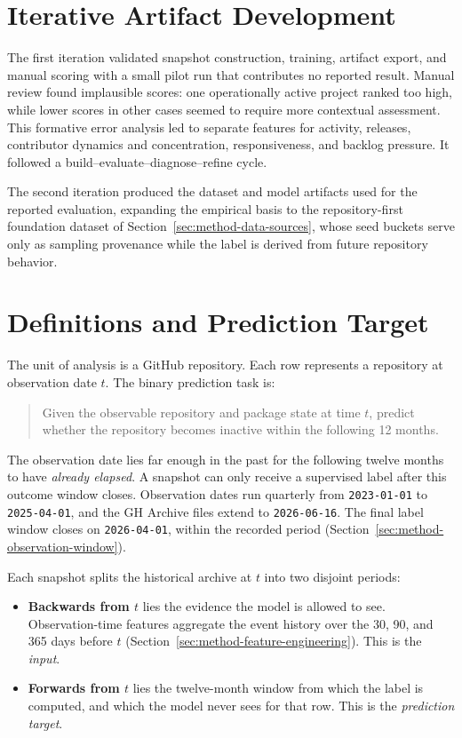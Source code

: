 \section{Iterative Artifact Development}
\label{sec:method-iterative-development}

The first iteration validated snapshot construction, training, artifact export,
and manual scoring with a small pilot run that contributes no reported result.
Manual review found implausible scores: one operationally active project ranked
too high, while lower scores in other cases seemed to require more contextual
assessment. This formative error analysis led to separate features for activity,
releases, contributor dynamics and concentration, responsiveness, and backlog
pressure. It followed a build--evaluate--diagnose--refine cycle.

The second iteration produced the dataset and model artifacts used for the reported evaluation, expanding the empirical basis to the repository-first foundation dataset of Section~\ref{sec:method-data-sources}, whose seed buckets serve only as sampling provenance while the label is derived from future repository behavior.

\section{Definitions and Prediction Target}
\label{sec:method-definitions}

The unit of analysis is a GitHub repository. Each row represents a repository at
observation date \(t\). The binary prediction task is:

\begin{quote}
Given the observable repository and package state at time \(t\), predict whether the repository becomes inactive within the following 12 months.
\end{quote}

The observation date lies far enough in the past for the following twelve months
to have \emph{already elapsed}. A snapshot can only receive a supervised label after this
outcome window closes. Observation dates run quarterly from
\texttt{2023-01-01} to \texttt{2025-04-01}, and the GH Archive files extend to
\texttt{2026-06-16}. The final label window closes on
\texttt{2026-04-01}, within the recorded period
(Section~\ref{sec:method-observation-window}).

Each snapshot splits the historical archive at \(t\) into two disjoint periods:

\begin{itemize}
    \item \textbf{Backwards from \(t\)} lies the evidence the model is allowed to see. Observation-time features aggregate the event history over the 30, 90, and 365 days before \(t\) (Section~\ref{sec:method-feature-engineering}). This is the \emph{input}.
    \item \textbf{Forwards from \(t\)} lies the twelve-month window from which the label is computed, and which the model never sees for that row. This is the \emph{prediction target}.
\end{itemize}


